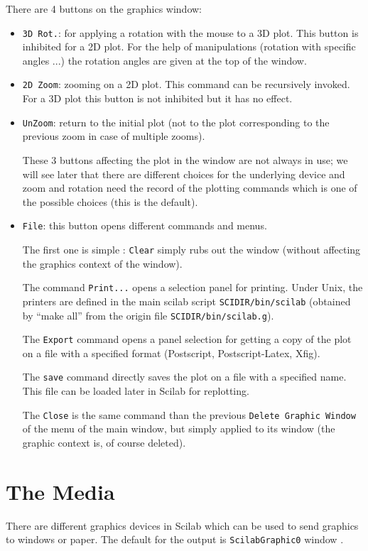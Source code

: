 There are 4 buttons on the graphics window:
\begin{itemize}
	\item \verb+3D Rot.+: for applying a rotation with the mouse to a
3D plot. This button is inhibited for a 2D plot. For the help of
manipulations (rotation with specific angles ...) the rotation angles 
are given at the top of the window.
	\item \verb+2D Zoom+: zooming on a 2D plot. This command can be
recursively invoked. For a 3D plot this button is not inhibited but it
has no effect.
	\item \verb+UnZoom+: return to the initial plot (not to the plot
corresponding to the previous zoom in case of multiple zooms).

These 3 buttons affecting the plot in the window are not always in
use; we will see later that there are different choices for the 
underlying device and zoom and rotation need the record of the
plotting commands which is one of the possible choices (this is the
default).

	
	\item \verb+File+: this button opens different commands and menus.

The first one is simple : {\tt Clear} simply rubs out the window
(without affecting the graphics context of the window).

The command {\tt Print...} opens a selection panel for printing. 
Under Unix, the printers are defined in the main scilab script 
{\tt SCIDIR/bin/scilab} (obtained by ``make all'' from the origin 
file {\tt SCIDIR/bin/scilab.g}).

The {\tt Export} command opens a panel selection for getting a copy of the 
plot on a file with a specified format (Postscript, Postscript-Latex, Xfig).

The {\tt save} command directly saves the plot on a file with a
specified name. This file can be loaded later in Scilab for replotting.

The {\tt Close} is the same command than the previous {\tt Delete
Graphic Window} of the menu of the main window, but simply 
applied to its window (the graphic context is, of course deleted). 

\end{itemize}

 
\section{The Media}
There are different graphics devices in Scilab which can be used to send
graphics to windows or paper. The default for the output is 
\verb+ScilabGraphic0+ window .

